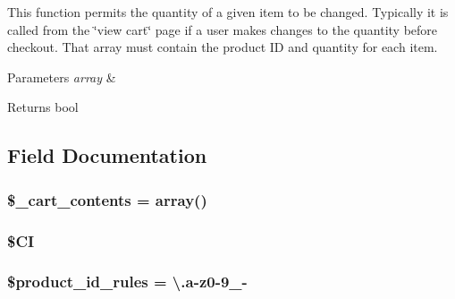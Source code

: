 This function permits the quantity of a given item to be changed. Typically it is called from the \char`\"{}view cart\char`\"{} page if a user makes changes to the quantity before checkout. That array must contain the product I\+D and quantity for each item.


\begin{DoxyParams}{Parameters}
{\em array} & \\
\hline
\end{DoxyParams}
\begin{DoxyReturn}{Returns}
bool 
\end{DoxyReturn}


\subsection{Field Documentation}
\hypertarget{class_c_i___cart_a93aff4174af6004d8cc7a51bf0c59632}{}
\subsubsection[{\$\+\_\+cart\+\_\+contents}]{\setlength{\rightskip}{0pt plus 5cm}\$\+\_\+cart\+\_\+contents = array()\hspace{0.3cm}{\ttfamily [protected]}}\label{class_c_i___cart_a93aff4174af6004d8cc7a51bf0c59632}
\hypertarget{class_c_i___cart_ae0314d046ddf7fcfaec03222977427d3}{}
\subsubsection[{\$\+C\+I}]{\setlength{\rightskip}{0pt plus 5cm}\$C\+I\hspace{0.3cm}{\ttfamily [protected]}}\label{class_c_i___cart_ae0314d046ddf7fcfaec03222977427d3}
\hypertarget{class_c_i___cart_aef9fb0bb2a9ab37008d77ed80b7b122b}{}
\subsubsection[{\$product\+\_\+id\+\_\+rules}]{\setlength{\rightskip}{0pt plus 5cm}\$product\+\_\+id\+\_\+rules = \textquotesingle{}\textbackslash{}.{\bf a}-\/z0-\/9\+\_\+-\/\textquotesingle{}}\label{class_c_i___cart_aef9fb0bb2a9ab37008d77ed80b7b122b}
\hypertarget{class_c_i___cart_afdc2e791be5e676e94580a0d9ed63ebf}{}
